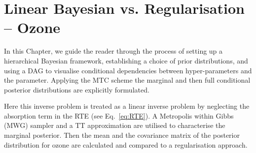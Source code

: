 \chapter{Linear Bayesian vs. Regularisation -- Ozone}
\label{ch:LinVsReg}


In this Chapter, we guide the reader through the process of setting up a hierarchical Bayesian framework, establishing a choice of prior distributions, and using a DAG to visualise conditional dependencies between hyper-parameters and the parameter.
Applying the MTC scheme the marginal and then full conditional posterior distributions are explicitly formulated.


Here this inverse problem is treated as a linear inverse problem by neglecting the absorption term in the RTE (see Eq.~\ref{eq:RTE}).
A Metropolis within Gibbs (MWG) sampler and a TT approximation are utilised to characterise the marginal posterior.
Then the mean and the covariance matrix of the posterior distribution for ozone are calculated and compared to a regularisation approach.


